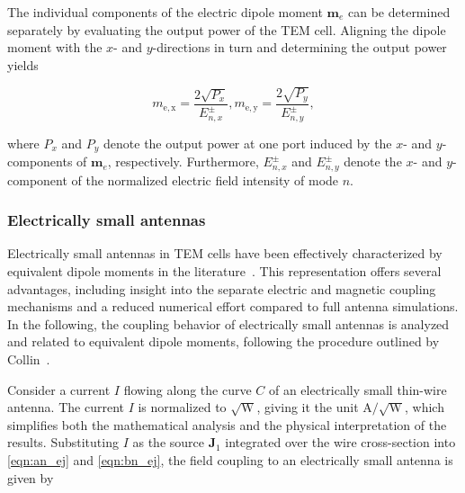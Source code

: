The individual components of the electric dipole moment $\mathbf{m}_e$ can be 
determined separately by evaluating the output power of the TEM cell. Aligning 
the dipole moment with the $x$- and $y$-directions in turn and determining the output power yields~\cite{Sreenivasiah_Chang_Ma_1981}

\begin{subequations}
	\begin{equation}
		m_{\mathrm{e,x}} = \frac{2\sqrt{P_x}}{E^\pm_{n,x}},
		\label{eqn:e0x_mse}
	\end{equation}
	\begin{equation}
		m_{\mathrm{e,y}} = \frac{2\sqrt{P_y}}{E^\pm_{n,y}},
		\label{eqn:e0y_mse}
	\end{equation}
\end{subequations}

where $P_x$ and $P_y$ denote the output power at one port induced by the 
$x$- and $y$-components of $\mathbf{m}_e$, respectively. Furthermore, $E^\pm_{n,x}$ and $E^\pm_{n,y}$ denote the $x$- and $y$-component of the normalized electric field intensity of mode $n$.

\subsubsection{Electrically small antennas}\label{sec:el_small_antennas}

Electrically small antennas in TEM cells have been effectively 
characterized by equivalent dipole moments in the 
literature~\cites{Kreindl_Bauernfeind_Weiss_Stockreiter_Kaltenbacher_2024,
	Sreenivasiah_Chang_Ma_1981}. This representation offers several 
advantages, including insight into the separate electric and magnetic 
coupling mechanisms and a reduced numerical effort compared to full 
antenna simulations. In the following, the coupling behavior of 
electrically small antennas is analyzed and related to equivalent dipole 
moments, following the procedure outlined by 
Collin~\cite[pp.~360--362]{Collin_2015}.

Consider a current $I$ flowing along the curve $C$ of an electrically small thin-wire antenna. The current $I$ is normalized to $\sqrt{\mathrm{W}}$, giving it the unit $\mathrm{A/\sqrt{W}}$, which simplifies both the mathematical analysis and the physical interpretation of the results. Substituting $I$ as the source $\mathbf{J}_1$ integrated over the wire cross-section into \eqref{eqn:an_ej} and \eqref{eqn:bn_ej}, the field coupling to an electrically small antenna is given by~\cite[p.~361]{Collin_2015}

